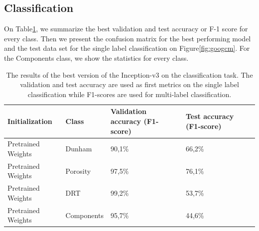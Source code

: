 \subsection{Classification}
On Table\ref{tab:googbest}, we summarize the best validation and test accuracy or F-1 score for every class. Then we present the confusion matrix for the best performing model and the test data set for the single label classification on Figure\ref{fig:googcm}. For the Components class, we show the statistics for every class. 

\begin{table}
\caption{\label{tab:googbest} The results of the best version of the Inception-v3 on the classification task. The validation and test accuracy are used as first metrics on the single label classification while F1-scores are used for multi-label classification.}
\centering
\begin{tabular}[b]{| l | l | l | l | l |}
\hline
    Initialization & Class & Validation accuracy (F1-score) & Test accuracy (F1-score) \ \\ \hline
    Pretrained Weights & Dunham &  90,1\%  & 66,2\% \\ \hline
    Pretrained Weights & Porosity & 97,5\%  &  76,1\% \\ \hline
    Pretrained Weights &DRT & 99,2\% & 53,7\% \\ \hline
    Pretrained Weights &Components & 95,7\% &  44,6\% \\ \hline
\end{tabular} 
\end{table}


